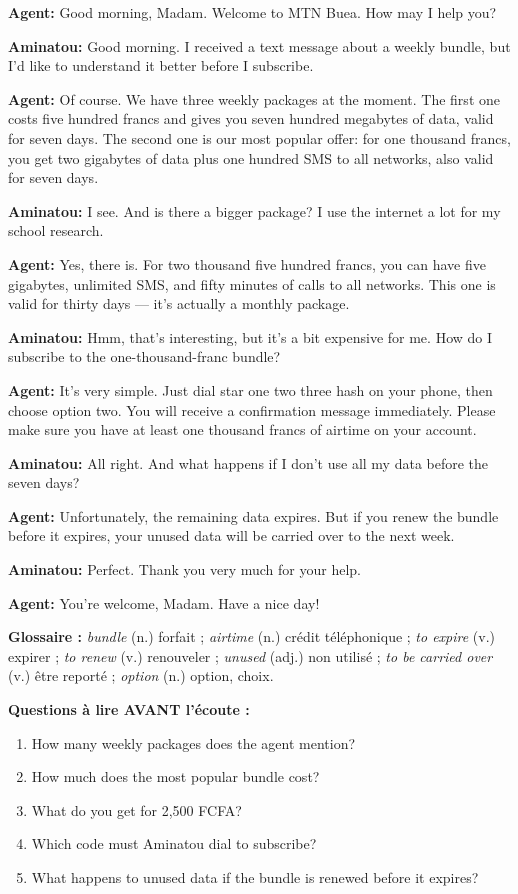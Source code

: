 \documentclass[11pt]{article}
\begin{document}
\begin{textebox}
\textbf{Agent:} Good morning, Madam. Welcome to MTN Buea. How may I help you?

\textbf{Aminatou:} Good morning. I received a text message about a weekly bundle, but I'd like to understand it better before I subscribe.

\textbf{Agent:} Of course. We have three weekly packages at the moment. The first one costs five hundred francs and gives you seven hundred megabytes of data, valid for seven days. The second one is our most popular offer: for one thousand francs, you get two gigabytes of data plus one hundred SMS to all networks, also valid for seven days.

\textbf{Aminatou:} I see. And is there a bigger package? I use the internet a lot for my school research.

\textbf{Agent:} Yes, there is. For two thousand five hundred francs, you can have five gigabytes, unlimited SMS, and fifty minutes of calls to all networks. This one is valid for thirty days — it's actually a monthly package.

\textbf{Aminatou:} Hmm, that's interesting, but it's a bit expensive for me. How do I subscribe to the one-thousand-franc bundle?

\textbf{Agent:} It's very simple. Just dial star one two three hash on your phone, then choose option two. You will receive a confirmation message immediately. Please make sure you have at least one thousand francs of airtime on your account.

\textbf{Aminatou:} All right. And what happens if I don't use all my data before the seven days?

\textbf{Agent:} Unfortunately, the remaining data expires. But if you renew the bundle before it expires, your unused data will be carried over to the next week.

\textbf{Aminatou:} Perfect. Thank you very much for your help.

\textbf{Agent:} You're welcome, Madam. Have a nice day!
\end{textebox}

\textbf{Glossaire :} \emph{bundle} (n.) forfait ; \emph{airtime} (n.) crédit téléphonique ; \emph{to expire} (v.) expirer ; \emph{to renew} (v.) renouveler ; \emph{unused} (adj.) non utilisé ; \emph{to be carried over} (v.) être reporté ; \emph{option} (n.) option, choix.

\textbf{Questions à lire AVANT l'écoute :}
\begin{enumerate}
\item How many weekly packages does the agent mention?
\item How much does the most popular bundle cost?
\item What do you get for 2,500 FCFA?
\item Which code must Aminatou dial to subscribe?
\item What happens to unused data if the bundle is renewed before it expires?
\end{enumerate}
\end{document}
